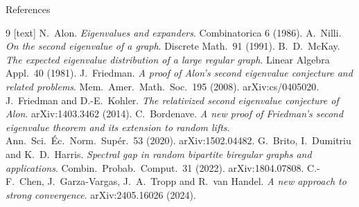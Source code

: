 \documentclass[aspectratio=169,10pt]{beamer}
\begin{document}
\begin{frame}{References}
  \scriptsize
  \begin{thebibliography}{9}
    [text]
    \setlength{\itemsep}{0.5mm}
     N.~Alon. \emph{Eigenvalues and expanders}. Combinatorica 6 (1986).
     A.~Nilli. \emph{On the second eigenvalue of a graph}. Discrete Math.\ 91 (1991).
     B.~D.~McKay. \emph{The expected eigenvalue distribution of a large regular graph}.
      Linear Algebra Appl.\ 40 (1981).
     J.~Friedman. \emph{A proof of Alon's second eigenvalue conjecture and related problems}.
      Mem.\ Amer.\ Math.\ Soc.\ 195 (2008). arXiv:cs/0405020.
     J.~Friedman and D.-E.~Kohler. \emph{The relativized second eigenvalue conjecture of Alon}.
      arXiv:1403.3462 (2014).
     C.~Bordenave. \emph{A new proof of Friedman's second eigenvalue theorem and its extension to random lifts}.
      Ann.\ Sci.\ \'Ec.\ Norm.\ Sup\'er.\ 53 (2020). arXiv:1502.04482.
     G.~Brito, I.~Dumitriu and K.~D.~Harris. \emph{Spectral gap in random bipartite biregular graphs and applications}.
      Combin.\ Probab.\ Comput.\ 31 (2022). arXiv:1804.07808.
     C.-F.~Chen, J.~Garza-Vargas, J.~A.~Tropp and R.~van Handel. \emph{A new approach to strong convergence}.
      arXiv:2405.16026 (2024).
  \end{thebibliography}
\end{frame}
\end{document}
